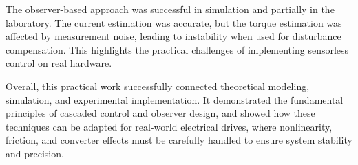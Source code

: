 \documentclass{rapportCS}
\begin{document}
The observer-based approach was successful in simulation and partially in the laboratory. 
The current estimation was accurate, but the torque estimation was affected by measurement noise, leading to instability when used for disturbance compensation. 
This highlights the practical challenges of implementing sensorless control on real hardware.

Overall, this practical work successfully connected theoretical modeling, simulation, and experimental implementation. 
It demonstrated the fundamental principles of cascaded control and observer design, and showed how these techniques can be adapted for real-world electrical drives, where nonlinearity, friction, and converter effects must be carefully handled to ensure system stability and precision.
\end{document}
